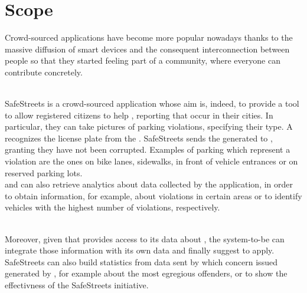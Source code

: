 \documentclass[../../rasd.tex]{subfiles}
\begin{document}
\section{Scope\label{sect:1.2}}
	
Crowd-sourced applications have become more popular nowadays thanks to the massive diffusion of smart devices and the consequent interconnection between people so that they started feeling part of a community, where everyone can contribute concretely.\\\

SafeStreets is a crowd-sourced application whose aim is, indeed, to provide a tool to allow registered citizens to help , reporting  that occur in their cities. In particular, they can take pictures of parking violations, specifying their type. A  recognizes the license plate from the . SafeStreets sends the generated  to , granting they have not been corrupted. Examples of parking which represent a violation are the ones on bike lanes, sidewalks, in front of vehicle entrances or on reserved parking lots.\\
 and  can also retrieve analytics about data collected by the application, in order to obtain  information, for example, about violations in certain areas or to identify vehicles with the highest number of violations, respectively.\\\

Moreover, given that  provides access to its data about , the system-to-be can integrate those information with its own data and finally suggest   to apply.\\
SafeStreets can also build statistics from data sent by  which concern issued  generated by , for example about the most egregious offenders, or to show the effectivness of the SafeStreets initiative.
\end{document}
